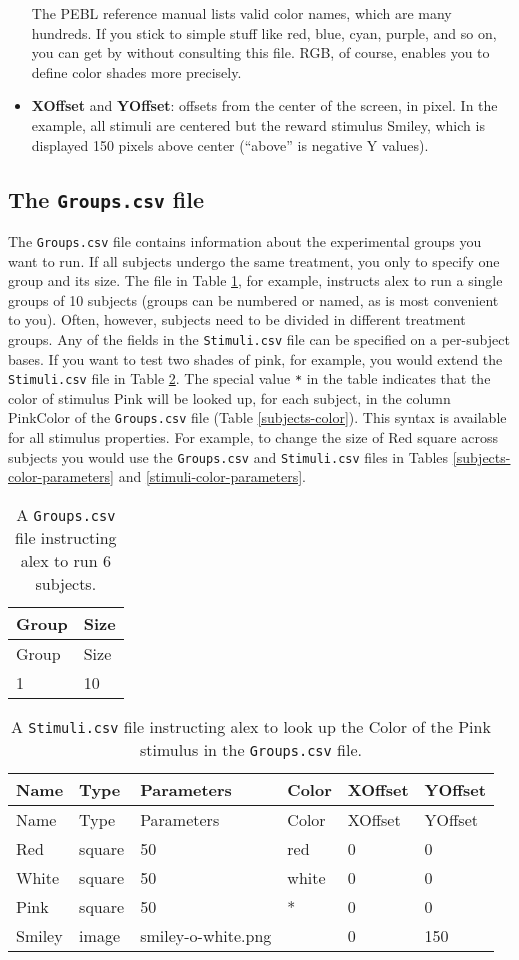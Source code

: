 \documentclass[11pt,]{article}
\begin{document}
\begin{itemize}
  The PEBL reference manual lists valid color names, which are many
  hundreds. If you stick to simple stuff like red, blue, cyan, purple,
  and so on, you can get by without consulting this file. RGB, of
  course, enables you to define color shades more precisely.
\item
  \textbf{XOffset} and \textbf{YOffset}: offsets from the center of the
  screen, in pixel. In the example, all stimuli are centered but the
  reward stimulus Smiley, which is displayed 150 pixels above center
  (``above'' is negative Y values).
\end{itemize}

\subsection{The \texttt{Groups.csv} file}\label{the-groups.csv-file}

The \texttt{Groups.csv} file contains information about the experimental
groups you want to run. If all subjects undergo the same treatment, you
only to specify one group and its size. The file in Table
\ref{subjects}, for example, instructs alex to run a single groups of 10
subjects (groups can be numbered or named, as is most convenient to
you). Often, however, subjects need to be divided in different treatment
groups. Any of the fields in the \texttt{Stimuli.csv} file can be
specified on a per-subject bases. If you want to test two shades of
pink, for example, you would extend the \texttt{Stimuli.csv} file in
Table \ref{stimuli-color}. The special value \texttt{*} in the table
indicates that the color of stimulus Pink will be looked up, for each
subject, in the column PinkColor of the \texttt{Groups.csv} file (Table
\ref{subjects-color}). This syntax is available for all stimulus
properties. For example, to change the size of Red square across
subjects you would use the \texttt{Groups.csv} and \texttt{Stimuli.csv}
files in Tables \ref{subjects-color-parameters} and
\ref{stimuli-color-parameters}.

\begin{longtable}[c]{@{}ll@{}}
\caption{A \texttt{Groups.csv} file instructing alex to run 6 subjects.
\label{subjects}}\tabularnewline
\toprule
Group & Size\tabularnewline
\midrule
\endfirsthead
\toprule
Group & Size\tabularnewline
\midrule
\endhead
1 & 10\tabularnewline
\bottomrule
\end{longtable}

\begin{longtable}[c]{@{}llllll@{}}
\caption{A \texttt{Stimuli.csv} file instructing alex to look up the
Color of the Pink stimulus in the \texttt{Groups.csv} file.
\label{stimuli-color}}\tabularnewline
\toprule
Name & Type & Parameters & Color & XOffset & YOffset\tabularnewline
\midrule
\endfirsthead
\toprule
Name & Type & Parameters & Color & XOffset & YOffset\tabularnewline
\midrule
\endhead
Red & square & 50 & red & 0 & 0\tabularnewline
White & square & 50 & white & 0 & 0\tabularnewline
Pink & square & 50 & * & 0 & 0\tabularnewline
Smiley & image & smiley-o-white.png & & 0 & 150\tabularnewline
\bottomrule
\end{longtable}
\end{document}
